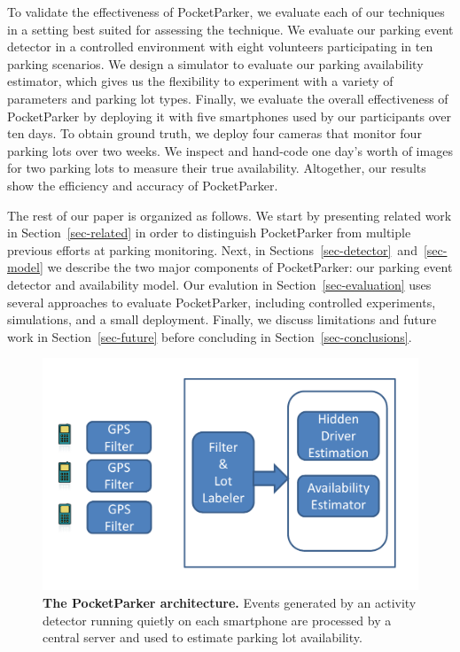 To validate the effectiveness of PocketParker, we evaluate each of our
techniques in a setting best suited for assessing the technique. We evaluate
our parking event detector in a controlled environment with eight volunteers
participating in ten parking scenarios. We design a simulator to evaluate our
parking availability estimator, which gives us the flexibility to experiment
with a variety of parameters and parking lot types. Finally, we evaluate the
overall effectiveness of PocketParker by deploying it with five smartphones used
by our participants over ten days. To obtain ground truth, we deploy four
cameras that monitor four parking lots over two weeks. We inspect and hand-code
one day's worth of images for two parking lots to measure their true
availability. Altogether, our results show the efficiency and accuracy of
PocketParker.

The rest of our paper is organized as follows. We start by presenting related
work in Section~\ref{sec-related} in order to distinguish PocketParker from
multiple previous efforts at parking monitoring. Next, in
Sections~\ref{sec-detector}~and~\ref{sec-model} we describe the two major
components of PocketParker: our parking event detector and availability
model. Our evalution in Section~\ref{sec-evaluation} uses several approaches
to evaluate PocketParker, including controlled experiments, simulations, and
a small deployment. Finally, we discuss limitations and future work in
Section~\ref{sec-future} before concluding in Section~\ref{sec-conclusions}.

\begin{figure}
\centering
\includegraphics[width=\columnwidth]{./figures/blockdiagram.pdf}

\caption{\textbf{The PocketParker architecture.} Events generated by an
activity detector running quietly on each smartphone are processed by a
central server and used to estimate parking lot availability.}

\label{fig-arch}
\end{figure}
